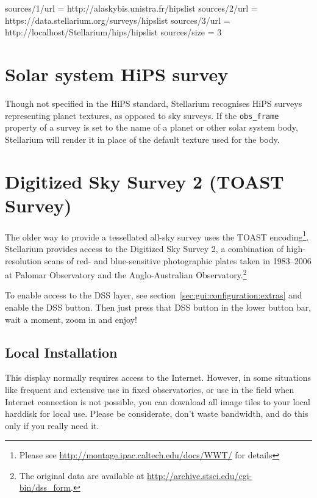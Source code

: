 \begin{configfile}
[hips]
sources/1/url = http://alaskybis.unistra.fr/hipslist
sources/2/url = https://data.stellarium.org/surveys/hipslist
sources/3/url = http://localhost/Stellarium/hips/hipslist
sources/size  = 3
\end{configfile}

\section{Solar system HiPS survey}

Though not specified in the HiPS standard, Stellarium recognises HiPS surveys
representing planet textures, as opposed to sky surveys.  If the
\texttt{obs\_frame} property of a survey is set to the name of a planet or
other solar system body, Stellarium will render it in place of the default
texture used for the body.


\section{Digitized Sky Survey 2 (TOAST Survey)}
\label{sec:TOAST}

The older way to provide a tessellated all-sky survey uses the TOAST
encoding\footnote{Please see
  \url{http://montage.ipac.caltech.edu/docs/WWT/} for details}.
Stellarium provides access to the Digitized Sky Survey 2, a
combination of high-resolution scans of red- and blue-sensitive
photographic plates taken in 1983--2006 at Palomar Observatory and the
Anglo-Australian Observatory.\footnote{The original data are available
  at \url{http://archive.stsci.edu/cgi-bin/dss_form}.}

To enable access to the DSS layer, see
section~\ref{sec:gui:configuration:extras} and enable the DSS
button. Then just press that DSS button in the lower button bar, wait
a moment, zoom in and enjoy!

\subsection{Local Installation}

This display normally requires access to the Internet. However, in
some situations like frequent and extensive use in fixed observatories,
or use in the field when Internet connection is not possible, you can
download all image tiles to your local harddisk for local use. Please be
considerate, don't waste bandwidth, and do this only if you really need it.

